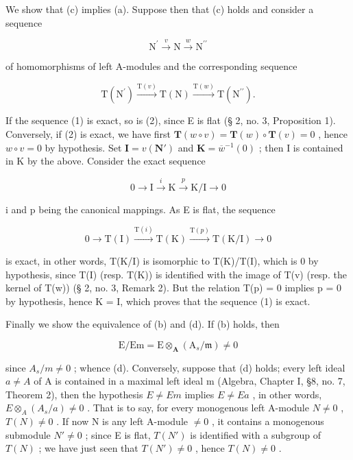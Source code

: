We show that (c) implies (a). Suppose then that (c) holds and consider a sequence

\[
\mathrm{N} ^ {\prime} \xrightarrow {v} \mathrm{N} \xrightarrow {w} \mathrm{N} ^ {\prime \prime}\tag{1}
\]

of homomorphisms of left A-modules and the corresponding sequence

\[
\mathrm{T} \left(\mathrm{N} ^ {\prime}\right) \xrightarrow {\mathrm{T} (v)} \mathrm{T} (\mathrm{N}) \xrightarrow {\mathrm{T} (w)} \mathrm{T} \left(\mathrm{N} ^ {\prime \prime}\right).\tag{2}
\]

If the sequence (1) is exact, so is (2), since E is flat (§ 2, no. 3, Proposition 1). Conversely, if (2) is exact, we have first \(\mathbf{T}(w \circ v) = \mathbf{T}(w) \circ \mathbf{T}(v) = 0\) , hence \(w \circ v = 0\) by hypothesis. Set \(\mathbf{I} = v(\mathbf{N}')\) and \(\mathbf{K} = \overline{w}^{-1}(0)\) ; then I is contained in K by the above. Consider the exact sequence

\[
0 \longrightarrow \mathrm{I} \stackrel {i} {\longrightarrow} \mathrm{K} \stackrel {p} {\longrightarrow} \mathrm{K} / \mathrm{I} \longrightarrow 0
\]

i and p being the canonical mappings. As E is flat, the sequence

\[
0 \longrightarrow \mathrm{T} (\mathrm{I}) \xrightarrow {\mathrm{T} (i)} \mathrm{T} (\mathrm{K}) \xrightarrow {\mathrm{T} (p)} \mathrm{T} (\mathrm{K} / \mathrm{I}) \longrightarrow 0
\]

is exact, in other words, T(K/I) is isomorphic to T(K)/T(I), which is 0 by hypothesis, since T(I) (resp. T(K)) is identified with the image of T(v) (resp. the kernel of T(w)) (§ 2, no. 3, Remark 2). But the relation T(p) = 0 implies p = 0 by hypothesis, hence K = I, which proves that the sequence (1) is exact.

Finally we show the equivalence of (b) and (d). If (b) holds, then

\[
\mathrm{E} / \mathrm{Em} = \mathrm{E} \otimes_ {\mathbf {A}} (\mathrm{A} _ {s} / \mathfrak {m}) \neq 0
\]

since \(A_{s}/m \neq 0\) ; whence (d). Conversely, suppose that (d) holds; every left ideal \(a \neq A\) of A is contained in a maximal left ideal m (Algebra, Chapter I, §8, no. 7, Theorem 2), then the hypothesis \(E \neq Em\) implies \(E \neq Ea\) , in other words, \(E \otimes_{A} (A_{s}/a) \neq 0\) . That is to say, for every monogenous left A-module \(N \neq 0\) , \(T(N) \neq 0\) . If now N is any left A-module \(\neq 0\) , it contains a monogenous submodule \(N' \neq 0\) ; since E is flat, \(T(N')\) is identified with a subgroup of \(T(N)\) ; we have just seen that \(T(N') \neq 0\) , hence \(T(N) \neq 0\) .

